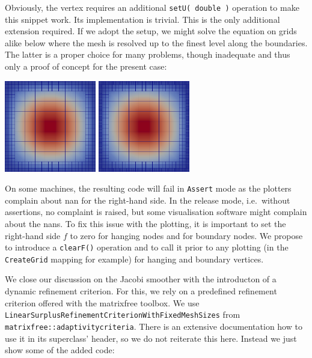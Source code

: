 \noindent
Obviously, the vertex requires an additional \texttt{setU( double )} operation
to make this snippet work.
Its implementation is trivial.
This is the only additional extension required.
If we adopt the setup, we might solve the equation on grids alike below where
the mesh is resolved up to the finest level along the boundaries. 
The latter is a proper choice for many problems, though inadequate and thus
only a proof of concept for the present case:

\begin{center}
  \includegraphics[width=0.3\textwidth]{42_matrix-free-multigrid/AdaptivePoisson3.png}
  \includegraphics[width=0.3\textwidth]{42_matrix-free-multigrid/AdaptivePoisson4.png}
\end{center}



\begin{remark}
  On some machines, the resulting code will fail in \texttt{Assert} mode as the
  plotters complain about nan for the right-hand side. In the release
  mode, i.e.~without assertions, no complaint is raised, but some visualisation
  software might complain about the nans. To fix this issue with the plotting,
  it is important to set the right-hand side $f$ to zero for hanging nodes and
  for boundary nodes. We propose to introduce a \texttt{clearF()} operation and
  to call it prior to any plotting (in the \texttt{CreateGrid} mapping for
  example) for hanging and boundary vertices.
\end{remark}

\noindent
We close our discussion on the Jacobi smoother with the introducton of a dynamic
refinement criterion.
For this, we rely on a predefined refinement criterion offered with the
matrixfree toolbox.
We use
\texttt{LinearSurplusRefinementCriterionWithFixedMeshSizes}
from \\
\texttt{matrixfree::adaptivitycriteria}.
There is an extensive documentation how to use it in its superclass' header, so
we do not reiterate this here.
Instead we just show some of the added code:

